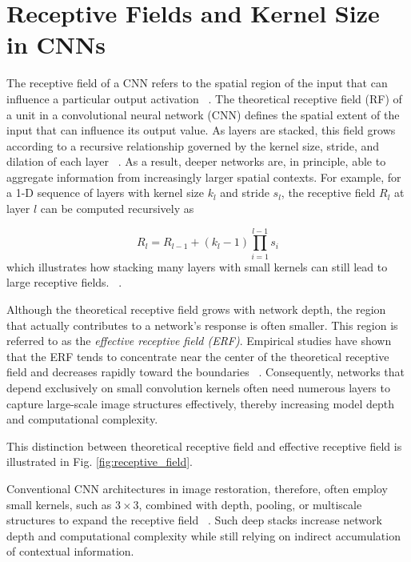 \section{Receptive Fields and Kernel Size in CNNs}
The receptive field of a CNN refers to the spatial region of the input that can influence a particular output activation ~\cite{Luo2016}. The theoretical receptive field (RF) of a unit in a convolutional neural network (CNN) defines the spatial extent of the input that can influence its output value. As layers are stacked, this field grows according to a recursive relationship governed by the kernel size, stride, and dilation of each layer ~\cite{Luo2016}.  As a result, deeper networks are, in principle, able to aggregate information from increasingly larger spatial contexts. For example, for a 1-D sequence of layers with kernel size $k_l$ and stride $s_l$, the receptive field $R_l$ at layer $l$  can be computed recursively as 

                 \begin{equation}
R_l = R_{l-1} + (k_l - 1)\prod_{i=1}^{l-1} s_i
\end{equation}
which illustrates how stacking many layers with small kernels can still lead to large receptive fields. ~\cite{Luo2016}.

Although the theoretical receptive field grows with network depth, the region that actually contributes to a network’s response is often smaller. This region is referred to as the \textit{effective receptive field (ERF)}. Empirical studies have shown that the ERF tends to concentrate near the center of the theoretical receptive field and decreases rapidly toward the boundaries  ~\cite{Luo2016}.  Consequently, networks that depend exclusively on small convolution kernels often need numerous layers to capture large-scale image structures effectively, thereby increasing model depth and computational complexity.

This distinction between theoretical receptive field and effective receptive field is illustrated in Fig. \ref{fig:receptive_field}. 

 
 Conventional CNN architectures in image restoration, therefore, often employ small kernels, such as $3\times3$, combined with depth, pooling, or multiscale structures to expand the receptive field ~\cite{simonyan2015vgg}. Such deep stacks increase network depth and computational complexity while still relying on indirect accumulation of contextual information.

 


